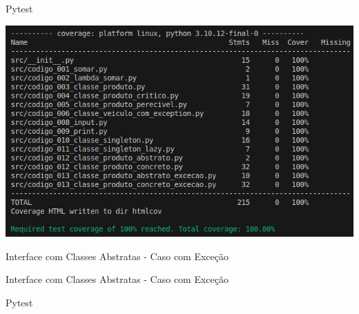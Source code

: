 \begin{frame}[t]{Pytest}
	
	
	\vspace{1em}
	\centering
	\includegraphics[scale=0.4]{imagens/fig-result-test-produto-concreto.png}

\vspace{0.25em}
\fontsize{9pt}{10}\par

\end{frame}






\begin{frame}[t]{Interface com Classes Abstratas - Caso com Exceção}
	
	
	
\end{frame}

\begin{frame}[t]{Interface com Classes Abstratas - Caso com Exceção}
	
	\vspace{-0.5em}
	
	
	
\end{frame}


\begin{frame}[t]{Pytest}
	
	\vspace{-1em}
	
	
\end{frame}











